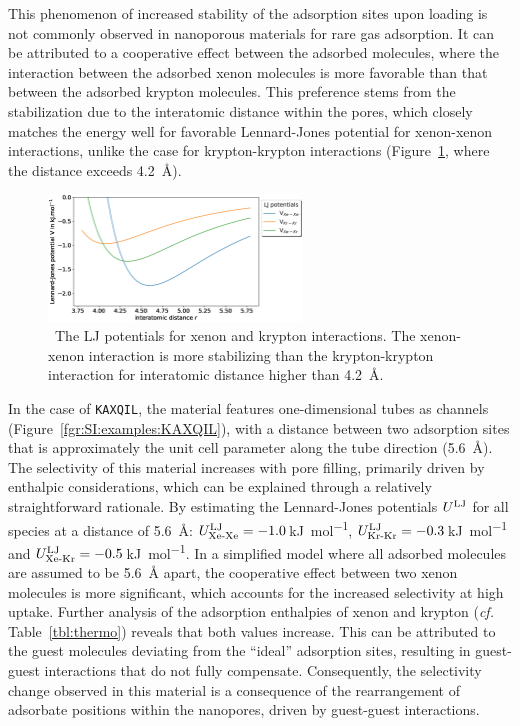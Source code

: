 \documentclass[main.tex]{subfiles}
\begin{document}
This phenomenon of increased stability of the adsorption sites upon loading is not commonly observed in nanoporous materials for rare gas adsorption. It can be attributed to a cooperative effect between the adsorbed molecules, where the interaction between the adsorbed xenon molecules is more favorable than that between the adsorbed krypton molecules. This preference stems from the stabilization due to the interatomic distance within the pores, which closely matches the energy well for favorable Lennard-Jones potential for xenon-xenon interactions, unlike the case for krypton-krypton interactions (Figure~\ref{fgr:LJ}, where the distance exceeds \SI{4.2}{\angstrom}).

\begin{figure}[ht]
  \centering
    \includegraphics[width=0.6\textwidth]{figures/2-thermo/lennard_jones.jpg}
    \caption{\ The LJ potentials for xenon and krypton interactions. The xenon-xenon interaction is more stabilizing than the krypton-krypton interaction for interatomic distance higher than \SI{4.2}{\angstrom}.}\label{fgr:LJ}
  \end{figure}

In the case of \texttt{KAXQIL}, the material features one-dimensional tubes as channels (Figure~\ref{fgr:SI:examples:KAXQIL}), with a distance between two adsorption sites that is approximately the unit cell parameter along the tube direction (\SI{5.6}{\angstrom}). The selectivity of this material increases with pore filling, primarily driven by enthalpic considerations, which can be explained through a relatively straightforward rationale. By estimating the Lennard-Jones potentials $U^{\text{LJ}}$ for all species at a distance of \SI{5.6}{\angstrom}: $U^{\text{LJ}}_{\text{Xe-Xe}}=-1.0$\,\si{\kilo\joule\per\mol}, $U^{\text{LJ}}_{\text{Kr-Kr}}=-0.3$\,\si{\kilo\joule\per\mol} and $U^{\text{LJ}}_{\text{Xe-Kr}}=-0.5$\,\si{\kilo\joule\per\mol}. In a simplified model where all adsorbed molecules are assumed to be \SI{5.6}{\angstrom} apart, the cooperative effect between two xenon molecules is more significant, which accounts for the increased selectivity at high uptake. Further analysis of the adsorption enthalpies of xenon and krypton (\emph{cf.} Table~\ref{tbl:thermo}) reveals that both values increase. This can be attributed to the guest molecules deviating from the ``ideal'' adsorption sites, resulting in guest-guest interactions that do not fully compensate. Consequently, the selectivity change observed in this material is a consequence of the rearrangement of adsorbate positions within the nanopores, driven by guest-guest interactions. 
\end{document}
